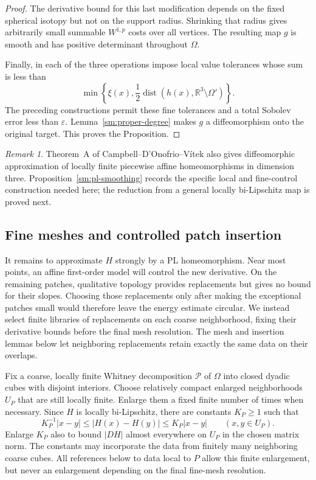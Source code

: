 \documentclass[11pt]{article}
\numberwithin{equation}{section}
\theoremstyle{definition}
\theoremstyle{remark}
\newtheorem{remark}[theorem]{Remark}
\begin{document}
\begin{proof}
The derivative bound for this last modification depends on the
fixed spherical isotopy but not on the support radius.  Shrinking
that radius gives arbitrarily small summable $W^{1,p}$ costs
over all vertices.  The resulting map $g$ is smooth and has
positive determinant throughout $\Omega$.

Finally, in each of the three operations impose local value
tolerances whose sum is less than
\[
 \min\!\left\{\xi(x),\frac12
 \operatorname{dist}(h(x),\mathbb R^3\setminus\Omega')\right\}.
\]
The preceding constructions permit these fine tolerances and a
total Sobolev error less than $\varepsilon$.  Lemma~\ref{sm:proper-degree}
makes $g$ a diffeomorphism onto the original target.  This proves
the Proposition.
\end{proof}

\begin{remark}
Theorem~A of Campbell--D'Onofrio--V\'itek
\cite{CampbellDOnofrioVitek2026} also gives diffeomorphic
approximation of locally finite piecewise affine homeomorphisms
in dimension three.  Proposition~\ref{sm:pl-smoothing} records the
specific local and fine-control construction needed here; the
reduction from a general locally bi-Lipschitz map is proved next.
\end{remark}

\subsection{Fine meshes and controlled patch insertion}

It remains to approximate $H$ strongly by a PL homeomorphism.
Near most points, an affine first-order model will control the new
derivative. On the remaining patches, qualitative topology provides
replacements but gives no bound for their slopes. Choosing those
replacements only after making the exceptional patches small would
therefore leave the energy estimate circular. We instead select finite
libraries of replacements on each coarse neighborhood, fixing their
derivative bounds before the final mesh resolution. The mesh and
insertion lemmas below let neighboring replacements retain exactly
the same data on their overlaps.

Fix a coarse, locally finite Whitney decomposition $\mathcal P$ of
$\Omega$ into closed dyadic cubes with disjoint interiors.  Choose
relatively compact enlarged neighborhoods $U_P$ that are still locally
finite.  Enlarge them a fixed finite number of times when necessary.
Since $H$ is locally bi-Lipschitz, there are constants $K_P\ge1$ such
that
\begin{equation}
 \label{sm:coarse-bilip}
 K_P^{-1}|x-y|\le |H(x)-H(y)|\le K_P|x-y|
 \qquad(x,y\in U_P).
\end{equation}
Enlarge $K_P$ also to bound $|DH|$ almost everywhere on $U_P$ in the
chosen matrix norm.  The constants may incorporate the data from finitely many neighboring
coarse cubes.  All references below to data local to $P$ allow this
finite enlargement, but never an enlargement depending on the final
fine-mesh resolution.
\end{document}
